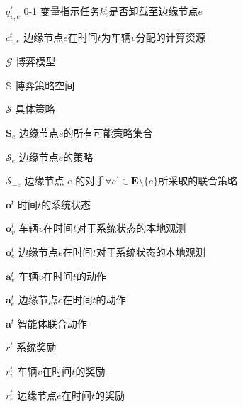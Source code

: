 \begin{denotation}[20mm][15mm]
	\item[$q_{v, e}^t$] 0-1 变量指示任务$k_v^t$是否卸载至边缘节点$e$
	\item[$c_{v, e}^t$] 边缘节点$e$在时间$t$为车辆$v$分配的计算资源
	\item[$\mathcal{G}$] 博弈模型
	\item[$\mathbb{S}$] 博弈策略空间
	\item[$\mathcal{S}$] 具体策略
	\item[$\mathbf{S}_{e}$] 边缘节点$e$的所有可能策略集合
	\item[$\mathcal{S}_{e}$] 边缘节点$e$的策略
	\item[$\mathcal{S}_{-e}$] 边缘节点 $e$ 的对手$\forall e^{\prime} \in \mathbf{E} \setminus \{e\}$所采取的联合策略
	\item[$\boldsymbol{o}^{t}$] 时间$t$的系统状态
	\item[$\boldsymbol{o}_{v}^{t}$] 车辆$v$在时间$t$对于系统状态的本地观测
	\item[$\boldsymbol{o}_{e}^{t}$] 边缘节点$e$在时间$t$对于系统状态的本地观测
	\item[$\boldsymbol{a}_{v}^{t}$] 车辆$v$在时间$t$的动作
	\item[$\boldsymbol{a}_{e}^{t}$] 边缘节点$e$在时间$t$的动作
	\item[$\boldsymbol{a}^{t}$] 智能体联合动作
	\item[$r^{t}$] 系统奖励
	\item[$r_{v}^{t}$] 车辆$v$在时间$t$的奖励
	\item[$r_{e}^{t}$] 边缘节点$e$在时间$t$的奖励
\end{denotation}

\endinput
